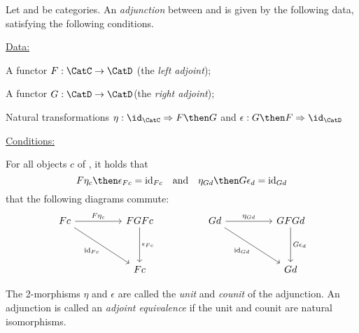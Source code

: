 \begin{ctdefinition}[]
  \label{def:cat-adjunction}
  Let \CatC and \CatD be categories. An \emph{adjunction} between \CatC and \CatD is given by the following data, satisfying the following conditions.

  \underline{Data:}
  \begin{compactenum}
    \item A functor $F: \CatC \rightarrow \CatD$ (the \emph{left adjoint});
    \item A functor $G: \CatD \rightarrow \CatD$(the \emph{right adjoint});
    \item Natural transformations $\eta : \id_\CatC \Rightarrow F \then G$ and $\epsilon : G \then F \Rightarrow \id_\CatD$
  \end{compactenum}

  \underline{Conditions:}
  \begin{compactenum}
    \item For all objects $c$ of \CatC, it holds that
    \[
      F\eta_c \then \epsilon_{Fc} = \text{id}_{Fc} \quad \text{and}  \quad  \eta_{Gd} \then G\epsilon_d = \text{id}_{Gd}
    \]
     that the following diagrams commute:
    \[\begin{tikzcd}
        Fc && FGFc && Gd && GFGd \\
        \\
        && Fc &&&& Gd
        \arrow["{F\eta_c}", from=1-1, to=1-3]
        \arrow["{\epsilon_{Fc}}", from=1-3, to=3-3]
        \arrow["{\text{id}_{Fc}}"', from=1-1, to=3-3]
        \arrow["{\text{id}_{Gd}}"', from=1-5, to=3-7]
        \arrow["{\eta_{Gd}}", from=1-5, to=1-7]
        \arrow["{G\epsilon_d}", from=1-7, to=3-7]
    \end{tikzcd}\]
  \end{compactenum}
  The 2-morphisms $\eta$ and $\epsilon$ are called the \emph{unit} and \emph{counit} of the adjunction.
  An adjunction is called an \emph{adjoint equivalence} if the unit and counit are natural isomorphisms.
\end{ctdefinition}






